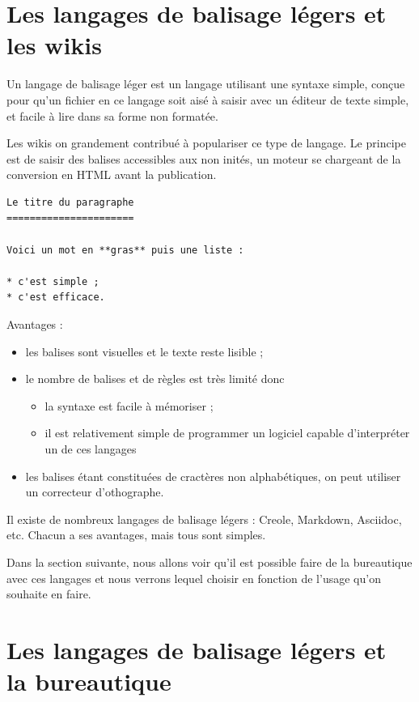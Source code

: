 \documentclass[]{article}
\begin{document}
\section{Les langages de balisage légers et les wikis}

Un langage de balisage léger est un langage utilisant une syntaxe
simple, conçue pour qu'un fichier en ce langage soit aisé à saisir avec
un éditeur de texte simple, et facile à lire dans sa forme non formatée.

Les wikis on grandement contribué à populariser ce type de langage. Le
principe est de saisir des balises accessibles aux non inités, un moteur
se chargeant de la conversion en HTML avant la publication.

\begin{verbatim}
Le titre du paragraphe
======================

Voici un mot en **gras** puis une liste :

* c'est simple ;
* c'est efficace.
\end{verbatim}
Avantages :

\begin{itemize}
\item
  les balises sont visuelles et le texte reste lisible ;
\item
  le nombre de balises et de règles est très limité donc
  \begin{itemize}
  \item
    la syntaxe est facile à mémoriser ;
  \item
    il est relativement simple de programmer un logiciel capable
    d'interpréter un de ces langages
  \end{itemize}
\item
  les balises étant constituées de cractères non alphabétiques, on peut
  utiliser un correcteur d'othographe.
\end{itemize}
Il existe de nombreux langages de balisage légers : Creole, Markdown,
Asciidoc, etc. Chacun a ses avantages, mais tous sont simples.

Dans la section suivante, nous allons voir qu'il est possible faire de
la bureautique avec ces langages et nous verrons lequel choisir en
fonction de l'usage qu'on souhaite en faire.

\section{Les langages de balisage légers et la bureautique}
\end{document}
